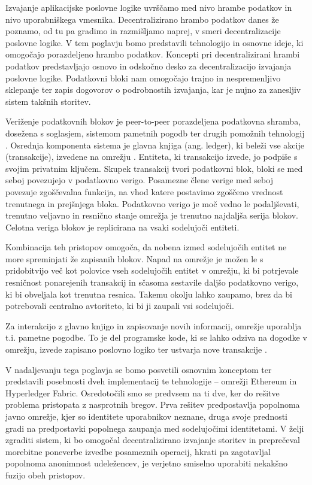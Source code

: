 \documentclass[a4paper, 12pt]{book}
\begin{document}
Izvajanje aplikacijske poslovne logike uvrščamo med nivo hrambe podatkov in nivo uporabniškega vmesnika.
Decentralizirano hrambo podatkov danes že poznamo, od tu pa gradimo in razmišljamo naprej, v smeri decentralizacije poslovne logike.
V tem poglavju bomo predstavili tehnologijo in osnovne ideje, ki omogočajo porazdeljeno hrambo podatkov.
Koncepti pri decentralizirani hrambi podatkov predstavljajo osnovo in odskočno desko za decentralizacijo izvajanja poslovne logike.
Podatkovni bloki nam omogočajo trajno in nespremenljivo sklepanje ter zapis dogovorov o podrobnostih izvajanja, kar je nujno za zanesljiv sistem takšnih storitev.

Veriženje podatkovnih blokov je peer-to-peer porazdeljena podatkovna shramba, dosežena s soglasjem, sistemom pametnih pogodb ter drugih po\-mo\-žnih tehnologij \cite{hyperledgerWeb}. Osrednja komponenta sistema je glavna knjiga (ang. ledger), ki beleži vse akcije (transakcije), izvedene na omrežju \cite{hyperledgerDocs}.
Entiteta, ki transakcijo izvede, jo podpiše s svojim privatnim ključem.
Skupek transakcij tvori podatkovni blok, bloki se med seboj povezujejo v podatkovno verigo.
Posamezne člene verige med seboj povezuje zgoščevalna funkcija, na vhod katere postavimo zgoščeno vrednost trenutnega in prejšnjega bloka.
Podatkovno verigo je moč vedno le podaljševati, trenutno veljavno in resnično stanje omrežja je trenutno najdaljša serija blokov.
Celotna veriga blokov je replicirana na vsaki sodelujoči entiteti.

Kombinacija teh pristopov omogoča, da nobena izmed sodelujočih entitet ne more spreminjati že zapisanih blokov.
Napad na omrežje je možen le s pridobitvijo več kot polovice vseh sodelujočih entitet v omrežju, ki bi potrjevale resničnost ponarejenih transakcij in sčasoma sestavile daljšo podatkovno verigo, ki bi obveljala kot trenutna resnica.
Takemu okolju lahko zaupamo, brez da bi potrebovali centralno avtoriteto, ki bi ji zaupali vsi sodelujoči.

Za interakcijo z glavno knjigo in zapisovanje novih informacij, omrežje uporablja t.i. pametne pogodbe.
To je del programske kode, ki se lahko odziva na dogodke v omrežju, izvede zapisano poslovno logiko ter ustvarja nove transakcije \cite{hyperledgerDocs}.

V nadaljevanju tega poglavja se bomo posvetili osnovnim konceptom ter predstavili posebnosti dveh implementacij te tehnologije -- omrežji Ethereum in Hyperledger Fabric.
Osredotočili smo se predvsem na ti dve, ker do rešitve problema pristopata z nasprotnih bregov.
Prva rešitev predpostavlja popolnoma javno omrežje, kjer so identitete uporabnikov neznane, druga svoje prednosti gradi na predpostavki popolnega zaupanja med sodelujočimi identitetami.
V želji zgraditi sistem, ki bo omogočal decentralizirano izvajanje storitev in preprečeval morebitne poneverbe izvedbe posameznih operacij, hkrati pa zagotavljal popolnoma anonimnost udeležencev, je verjetno smiselno uporabiti nekakšno fuzijo obeh pristopov.
\end{document}
